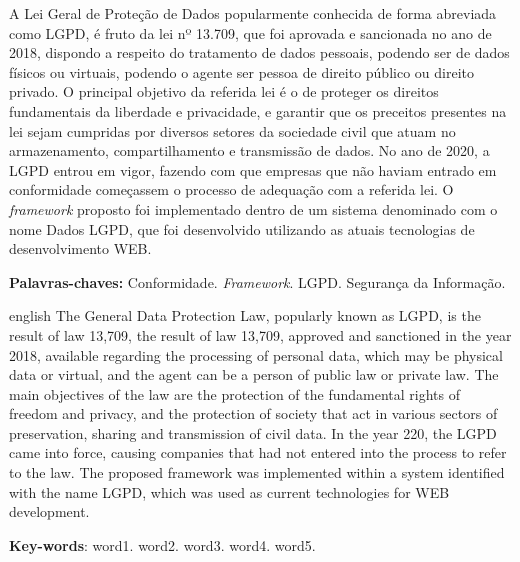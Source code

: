 \documentclass[
	12pt,				%
	openright,			%
	oneside,			%
	a4paper,			%
	english,			%
	french,				%
	spanish,			%
	brazil,				%
	]{abntex2}
\begin{document}
\begin{resumo}
\noindent
A Lei Geral de Proteção de Dados popularmente conhecida de forma abreviada como LGPD, é fruto da lei nº 13.709, que foi aprovada e sancionada no ano de 2018, dispondo a respeito do tratamento de dados pessoais, podendo ser de dados físicos ou virtuais, podendo o agente ser pessoa de direito público ou direito privado. O principal objetivo da referida lei é o de proteger os direitos fundamentais da liberdade e privacidade, e garantir que os preceitos presentes na lei sejam cumpridas por diversos setores da sociedade civil que atuam no armazenamento, compartilhamento e transmissão de dados. No ano de 2020, a LGPD entrou em vigor, fazendo com que empresas que não haviam entrado em conformidade começassem o processo de adequação com a referida lei. O \textit{framework} proposto foi implementado dentro de um sistema denominado com o nome Dados LGPD, que foi desenvolvido utilizando as atuais tecnologias de desenvolvimento WEB.

 \vspace{\onelineskip}
    
 \noindent
 \textbf{Palavras-chaves:} Conformidade. \textit{Framework}. LGPD. Segurança da Informação.
\end{resumo}

\begin{resumo}[Abstract]
 \begin{otherlanguage*}{english}
   \vspace{\onelineskip}
    \noindent 
The General Data Protection Law, popularly known as LGPD, is the result of law 13,709, the result of law 13,709, approved and sanctioned in the year 2018, available regarding the processing of personal data, which may be physical data or virtual, and the agent can be a person of public law or private law. The main objectives of the law are the protection of the fundamental rights of freedom and privacy, and the protection of society that act in various sectors of preservation, sharing and transmission of civil data. In the year 220, the LGPD came into force, causing companies that had not entered into the process to refer to the law. The proposed framework was implemented within a system identified with the name LGPD, which was used as current technologies for WEB development.
   
   \vspace{\onelineskip}
   
   \noindent  \textbf{Key-words}:  word1. word2. word3. word4. word5.
 \end{otherlanguage*}
\end{resumo}
\end{document}
